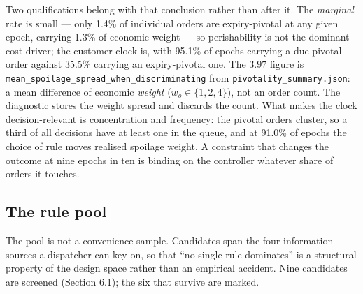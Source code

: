 \documentclass[review,3p,times]{elsarticle}
\theoremstyle{definition}
\begin{document}
Two qualifications belong with that conclusion rather than after it. The
\emph{marginal} rate is small --- only 1.4\% of individual orders are
expiry-pivotal at any given epoch, carrying 1.3\% of economic weight ---
so perishability is not the dominant cost driver; the customer clock is,
with 95.1\% of epochs carrying a due-pivotal order against 35.5\%
carrying an expiry-pivotal one. The \(3.97\) figure is
\texttt{mean\_spoilage\_spread\_when\_discriminating} from
\texttt{pivotality\_summary.json}: a mean difference of economic
\emph{weight} (\(w_o\in\{1,2,4\}\)), not an order count. The diagnostic
stores the weight spread and discards the count. What makes the clock
decision-relevant is concentration and frequency: the pivotal orders
cluster, so a third of all decisions have at least one in the queue, and
at 91.0\% of epochs the choice of rule moves realised spoilage weight. A
constraint that changes the outcome at nine epochs in ten is binding on
the controller whatever share of orders it touches.

\subsection{The rule pool}\label{the-rule-pool}

The pool is not a convenience sample. Candidates span the four
information sources a dispatcher can key on, so that ``no single rule
dominates'' is a structural property of the design space rather than an
empirical accident. Nine candidates are screened (Section 6.1); the six
that survive are marked.
\end{document}

